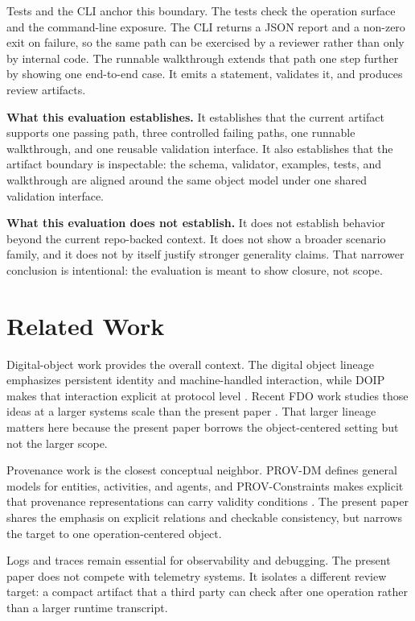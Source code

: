 \documentclass[conference]{IEEEtran}
\begin{document}
Tests and the CLI anchor this boundary. The tests check the operation surface and the command-line exposure. The CLI returns a JSON report and a non-zero exit on failure, so the same path can be exercised by a reviewer rather than only by internal code. The runnable walkthrough extends that path one step further by showing one end-to-end case. It emits a statement, validates it, and produces review artifacts.

\textbf{What this evaluation establishes.} It establishes that the current artifact supports one passing path, three controlled failing paths, one runnable walkthrough, and one reusable validation interface. It also establishes that the artifact boundary is inspectable: the schema, validator, examples, tests, and walkthrough are aligned around the same object model under one shared validation interface.

\textbf{What this evaluation does not establish.} It does not establish behavior beyond the current repo-backed context. It does not show a broader scenario family, and it does not by itself justify stronger generality claims. That narrower conclusion is intentional: the evaluation is meant to show closure, not scope.

\section{Related Work}

Digital-object work provides the overall context. The digital object lineage emphasizes persistent identity and machine-handled interaction, while DOIP makes that interaction explicit at protocol level \cite{kahn2006framework,dona2018doip}. Recent FDO work studies those ideas at a larger systems scale than the present paper \cite{soilandreyes2024evaluating}. That larger lineage matters here because the present paper borrows the object-centered setting but not the larger scope.

Provenance work is the closest conceptual neighbor. PROV-DM defines general models for entities, activities, and agents, and PROV-Constraints makes explicit that provenance representations can carry validity conditions \cite{groth2013provoverview,moreau2013provdm,cheney2013provconstraints}. The present paper shares the emphasis on explicit relations and checkable consistency, but narrows the target to one operation-centered object.

Logs and traces remain essential for observability and debugging. The present paper does not compete with telemetry systems. It isolates a different review target: a compact artifact that a third party can check after one operation rather than a larger runtime transcript.
\end{document}
